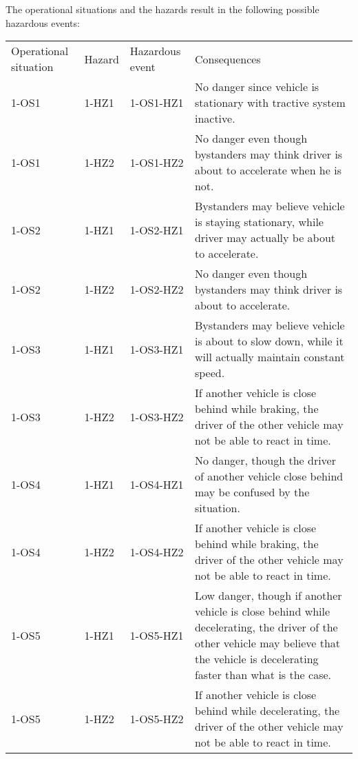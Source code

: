 %
%
The operational situations and the hazards result in the following possible hazardous events:
\begin{center}
\begin{tabular}{l|l|l|l}
Operational situation	& Hazard	& Hazardous event	& Consequences \\
1-OS1			& 1-HZ1	& 1-OS1-HZ1			& No danger since vehicle is stationary with tractive system inactive. \\
1-OS1			& 1-HZ2	& 1-OS1-HZ2			& No danger even though bystanders may think driver is about to accelerate when he is not. \\
1-OS2			& 1-HZ1	& 1-OS2-HZ1			& Bystanders may believe vehicle is staying stationary, while driver may actually be about to accelerate. \\
1-OS2			& 1-HZ2	& 1-OS2-HZ2			& No danger even though bystanders may think driver is about to accelerate. \\
1-OS3			& 1-HZ1	& 1-OS3-HZ1			& Bystanders may believe vehicle is about to slow down, while it will actually maintain constant speed. \\
1-OS3			& 1-HZ2	& 1-OS3-HZ2			& If another vehicle is close behind while braking, the driver of the other vehicle may not be able to react in time. \\
1-OS4			& 1-HZ1	& 1-OS4-HZ1			& No danger, though the driver of another vehicle close behind may be confused by the situation. \\
1-OS4			& 1-HZ2	& 1-OS4-HZ2			& If another vehicle is close behind while braking, the driver of the other vehicle may not be able to react in time. \\
1-OS5			& 1-HZ1	& 1-OS5-HZ1			& Low danger, though if another vehicle is close behind while decelerating, the driver of the other vehicle may believe that the vehicle is decelerating faster than what is the case. \\
1-OS5			& 1-HZ2	& 1-OS5-HZ2			& If another vehicle is close behind while decelerating, the driver of the other vehicle may not be able to react in time. \\

\end{tabular}
\end{center}
